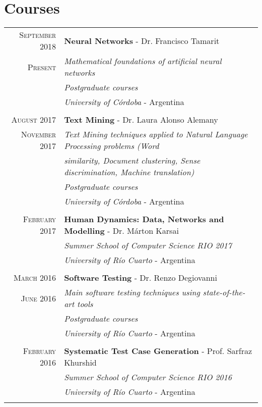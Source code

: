 \documentclass[a4paper,10pt]{article} %
\begin{document}
\section{Courses}
\begin{tabular}{rl}
\\
\textsc{September} 2018 & \textbf{Neural Networks} - Dr. Francisco Tamarit \\
\textsc{Present} & \textit{Mathematical foundations of artificial neural networks}  \\ 
& \textit{Postgraduate courses} \\
& \textit{University of Córdoba} - Argentina \\ & \\

\textsc{August} 2017 & \textbf{Text Mining} - Dr. Laura Alonso Alemany \\
\textsc{November} 2017 & \textit{Text Mining techniques applied to Natural Language Processing problems (Word}  \\ 
& \textit{similarity, Document clustering, Sense discrimination, Machine translation)} \\
& \textit{Postgraduate courses} \\
& \textit{University of Córdoba} - Argentina \\ & \\

\textsc{February} 2017 & \textbf{Human Dynamics: Data, Networks and Modelling} - Dr. Márton Karsai \\
& \textit{Summer School of Computer Science RIO 2017} \\
& \textit{University of Río Cuarto} - Argentina \\ & \\

\textsc{March} 2016 & \textbf{Software Testing} - Dr. Renzo Degiovanni \\
\textsc{June} 2016 & \textit{Main software testing techniques using state-of-the-art tools} \\
& \textit{Postgraduate courses} \\
& \textit{University of Río Cuarto} - Argentina \\ & \\

\textsc{February} 2016 & \textbf{Systematic Test Case Generation} - Prof. Sarfraz Khurshid \\
& \textit{Summer School of Computer Science RIO 2016} \\
& \textit{University of Río Cuarto} - Argentina \\ & \\


\end{tabular}
\end{document}
